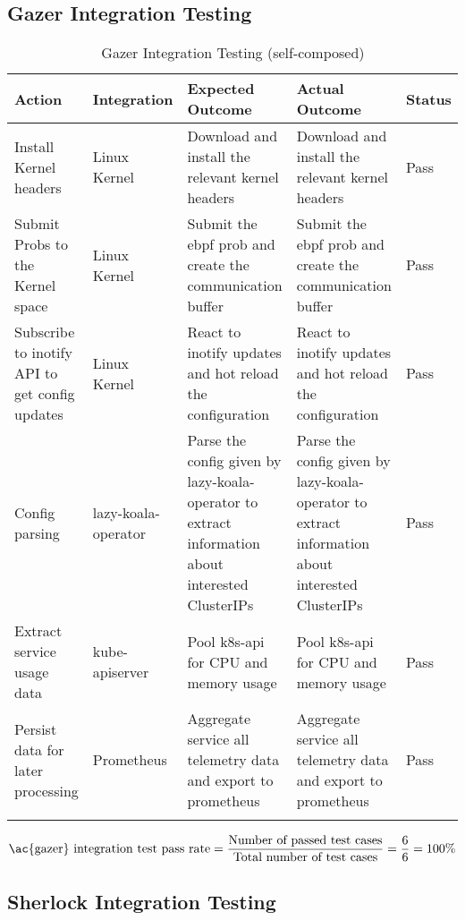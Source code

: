 \subsection{Gazer Integration Testing}

\begin{longtable}{|p{30mm}|p{21mm}|p{40mm}|p{40mm}|p{10mm}|}
    \hline
    \textbf{Action} &
      \textbf{Integration} &
      \textbf{Expected Outcome} &
      \textbf{Actual Outcome} &
      \textbf{Status} \\ \hline
    Install Kernel headers &
      Linux Kernel &
      Download and install the relevant kernel headers &
      Download and install the relevant kernel headers &
      Pass \\ \hline
    Submit Probs to the Kernel space &
      Linux Kernel &
      Submit the \ac{ebpf} prob and create the communication buffer &
      Submit the \ac{ebpf} prob and create the communication buffer &
      Pass \\ \hline
    Subscribe to inotify API to get config updates &
      Linux Kernel &
      React to inotify updates and hot reload the configuration &
      React to inotify updates and hot reload the configuration &
      Pass \\ \hline
    Config parsing &
      \ac{lazy-koala-operator} &
      Parse the config given by \ac{lazy-koala-operator} to extract information about interested ClusterIPs &
      Parse the config given by \ac{lazy-koala-operator} to extract information about interested ClusterIPs &
      Pass \\ \hline
    Extract service usage data &
      kube-apiserver &
      Pool k8s-api for CPU and memory usage &
      Pool k8s-api for CPU and memory usage &
      Pass \\ \hline
    Persist data for later processing &
      Prometheus &
      Aggregate service all telemetry data and export to prometheus &
      Aggregate service all telemetry data and export to prometheus &
      Pass \\ \hline
    \caption{Gazer Integration Testing (self-composed)}
\end{longtable}

\begingroup
\setlength{\abovedisplayskip}{-0.5cm}
\[
\text{\ac{gazer} integration test pass rate} = \frac{\text{Number of passed test cases}}{\text{Total number of test cases}} = \frac{6}{6} = 100\%
\]
\endgroup

\subsection{Sherlock Integration Testing}

